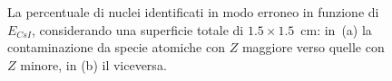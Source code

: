 \begin{figure}[!p] 
	\centering
	\hspace{10mm}
	\caption{La percentuale di nuclei identificati in modo erroneo in funzione di $E_{CsI}$, considerando una superficie totale di $1.5 \times 1.5$~cm: in~(a) la contaminazione da specie atomiche con $Z$ maggiore verso quelle con $Z$ minore, in (b) il viceversa.} \label{fig:leakage_res_1.5}
\end{figure}






